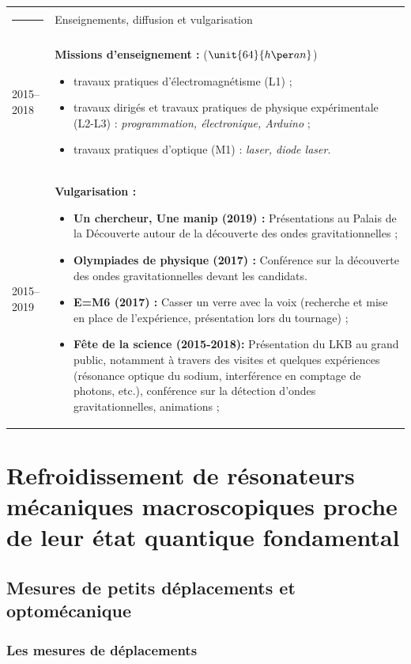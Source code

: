 \documentclass[12pt,a4paper]{article}
\begin{document}
\begin{tabular*}{\textwidth}{p{}<{\raggedleft}p{}}
\textcolor{theme}{\rule{0.12\textwidth}{2.5mm}} &
\large\textcolor{theme}{Enseignements, diffusion et vulgarisation} \vspace{3pt} \\
2015--2018 & \textbf{Missions d'enseignement :} ($\unit{64}{h\per an}$)
\begin{itemize}
\item travaux pratiques d'électromagnétisme (L1) ;
\item travaux dirigés et travaux pratiques de physique expérimentale (L2-L3) : \textit{programmation, électronique, Arduino} ;
\item travaux pratiques d'optique (M1) : \textit{laser, diode laser}.
\end{itemize}\\
\vspace{-8mm} 2015--2019 &
\vspace{-8mm}\textbf{Vulgarisation :}
\begin{itemize}
\item \textbf{Un chercheur, Une manip (2019) :} Présentations au Palais de la Découverte autour de la découverte des ondes gravitationnelles ;
\item \textbf{Olympiades de physique (2017) :} Conférence sur la découverte des ondes gravitationnelles devant les candidats.
\item \textbf{E=M6 (2017) :} Casser un verre avec la voix (recherche et mise en place de l'expérience, présentation lors du tournage) ;
\item \textbf{Fête de la science (2015-2018):} Présentation du LKB au grand public, notamment à travers des visites et quelques expériences (résonance optique du sodium, interférence en comptage de photons, etc.), conférence sur la détection d'ondes gravitationnelles, animations ;
\end{itemize}
\end{tabular*}

\section{Refroidissement de résonateurs mécaniques macroscopiques proche de leur état quantique fondamental}

\subsection{Mesures de petits déplacements et optomécanique}

\subsubsection{Les mesures de déplacements}
\end{document}
